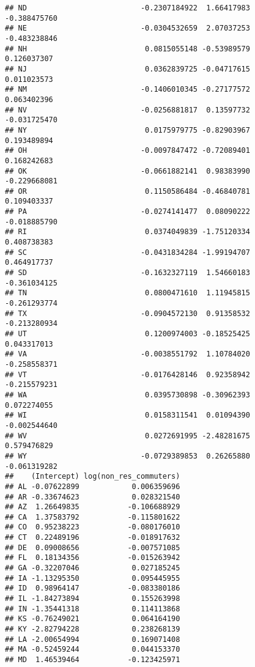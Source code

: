 \documentclass[
]{article}
\begin{document}
\begin{verbatim}
## ND                          -0.2307184922  1.66417983           -0.388475760
## NE                          -0.0304532659  2.07037253           -0.483238846
## NH                           0.0815055148 -0.53989579            0.126037307
## NJ                           0.0362839725 -0.04717615            0.011023573
## NM                          -0.1406010345 -0.27177572            0.063402396
## NV                          -0.0256881817  0.13597732           -0.031725470
## NY                           0.0175979775 -0.82903967            0.193489894
## OH                          -0.0097847472 -0.72089401            0.168242683
## OK                          -0.0661882141  0.98383990           -0.229668081
## OR                           0.1150586484 -0.46840781            0.109403337
## PA                          -0.0274141477  0.08090222           -0.018885790
## RI                           0.0374049839 -1.75120334            0.408738383
## SC                          -0.0431834284 -1.99194707            0.464917737
## SD                          -0.1632327119  1.54660183           -0.361034125
## TN                           0.0800471610  1.11945815           -0.261293774
## TX                          -0.0904572130  0.91358532           -0.213280934
## UT                           0.1200974003 -0.18525425            0.043317013
## VA                          -0.0038551792  1.10784020           -0.258558371
## VT                          -0.0176428146  0.92358942           -0.215579231
## WA                           0.0395730898 -0.30962393            0.072274055
## WI                           0.0158311541  0.01094390           -0.002544640
## WV                           0.0272691995 -2.48281675            0.579476829
## WY                          -0.0729389853  0.26265880           -0.061319282
##    (Intercept) log(non_res_commuters)
## AL -0.07622899            0.006359696
## AR -0.33674623            0.028321540
## AZ  1.26649835           -0.106688929
## CA  1.37583792           -0.115801622
## CO  0.95238223           -0.080176010
## CT  0.22489196           -0.018917632
## DE  0.09008656           -0.007571085
## FL  0.18134356           -0.015263942
## GA -0.32207046            0.027185245
## IA -1.13295350            0.095445955
## ID  0.98964147           -0.083380186
## IL -1.84273894            0.155263998
## IN -1.35441318            0.114113868
## KS -0.76249021            0.064164190
## KY -2.82794228            0.238268139
## LA -2.00654994            0.169071408
## MA -0.52459244            0.044153370
## MD  1.46539464           -0.123425971

\end{verbatim}
\end{document}
